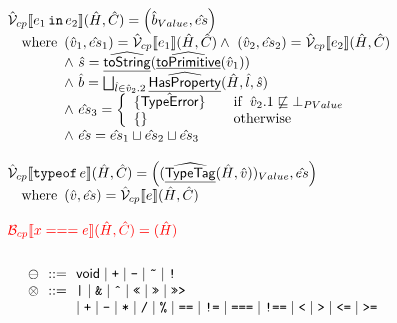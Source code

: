 \documentclass{article}
\newcommand{\SF}[1]{\mbox{\textsf{#1}}}
\newcommand{\TT}[1]{\mbox{\texttt{#1}}}
\newcommand{\inop}{\ensuremath{\otimes}}
\newcommand{\preop}{\ensuremath{\ominus}}
\newcommand{\wherec}[1]{{\rm where}\begin{array}[t]{l}#1\end{array}}
\newcommand{\ifc}[1]{{\rm if}\begin{array}[t]{l}#1\end{array}}
\newcommand{\owc}{{\rm otherwise}}
\newcommand{\B}{\mathcal{B}}
\newcommand{\aV}{\hat{\mathcal{V}}}
\newcommand{\lbr}{\llbracket}
\newcommand{\rbr}{\rrbracket}
\newcommand{\ahf}[1]{\widehat{\underline{\sf #1}}}
\newcommand{\exc}[1]{{\sf #1}}
\def\inred{\color{red}}
\begin{document}
\[\begin{array}{ll}
\aV_{cp}\lbr e_1\,\TT{in}\,e_2\rbr (\hat{H},\hat{C}) = \left(\hat{b}_{Value},\hat{es}\right)\\
\quad\wherec{
  (\hat{v}_1,\hat{es}_1)=\aV_{cp}\lbr e_1\rbr(\hat{H},\hat{C})
  \land\ (\hat{v}_2,\hat{es}_2)=\aV_{cp}\lbr e_2\rbr(\hat{H},\hat{C})\\
  \land\ \hat{s}=\ahf{toString}(\ahf{toPrimitive}(\hat{v}_1)) \\
  \land\ \hat{b} = \bigsqcup_{\hat{l}\in\hat{v}_2.2}\ahf{HasProperty}(\hat{H},\hat{l},\hat{s})\\
  \land\ \hat{es}_3 = \left\{
    \begin{array}{ll}
      \{\hat{\exc{TypeError}}\} & \quad\ifc{\hat{v}_2.1\not\sqsubseteq \bot_{PValue}} \\
      \{\} & \quad\owc \\
    \end{array}
  \right.\\
  \land\ \hat{es} = \hat{es}_1 \sqcup \hat{es}_2 \sqcup \hat{es}_3
}
\\\\

\aV_{cp}\lbr \TT{typeof}\,e\rbr (\hat{H},\hat{C}) = \left((\ahf{TypeTag}(\hat{H},\hat{v}))_{Value},\hat{es}\right)\\
\quad\wherec{
  (\hat{v},\hat{es}) = \aV_{cp}\lbr e\rbr(\hat{H},\hat{C})
}
\\\\

\inred \B_{cp} \lbr x === e\rbr(\hat{H},\hat{C}) = (\hat{H}) \\\\
\end{array}
\]
\[
\begin{array}{l@{~~}r@{~~}ll}

 \preop & ::= & \SF{void} %
                \mid \TT{+} \mid \TT{-} \mid \TT{\~} \mid \TT{!} \\
 \inop & ::= & %
               \TT{|} \mid \TT{\&} 
               \mid \TT{\^} \mid \TT{<<} \mid \TT{>>} \mid \TT{>>>} \\
& & \mid \TT{+} \mid \TT{-} \mid \TT{*} \mid \TT{/} \mid \TT{\%} \mid \TT{==} \mid \TT{!=} 
               \mid \TT{===} \mid \TT{!==} \mid \TT{<} \mid \TT{>} \mid \TT{<=} \mid \TT{>=} \\

\end{array}
\]
\end{document}
